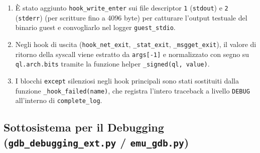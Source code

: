 \documentclass[11pt,a4paper]{article}
\begin{document}
\begin{itemize}
\begin{enumerate}
        \item È stato aggiunto \texttt{hook\_write\_enter} sui file descriptor \texttt{1} (\texttt{stdout}) e \texttt{2} (\texttt{stderr}) (per scritture fino a 4096 byte) per catturare l'output testuale del binario guest e convogliarlo nel logger \texttt{guest\_stdio}.
        \item Negli hook di uscita (\texttt{hook\_net\_exit}, \texttt{\_stat\_exit}, \texttt{\_msgget\_exit}), il valore di ritorno della syscall viene estratto da \texttt{args[-1]} e normalizzato con segno su \texttt{ql.arch.bits} tramite la funzione helper \texttt{\_signed(ql, value)}.
        \item I blocchi \texttt{except} silenziosi negli hook principali sono stati sostituiti dalla funzione \texttt{\_hook\_failed(name)}, che registra l'intero traceback a livello \texttt{DEBUG} all'interno di \texttt{complete\_log}.
    \end{enumerate}
\end{itemize}

\subsection{Sottosistema per il Debugging (\texttt{gdb\_debugging\_ext.py} / \texttt{emu\_gdb.py})}
\end{document}
